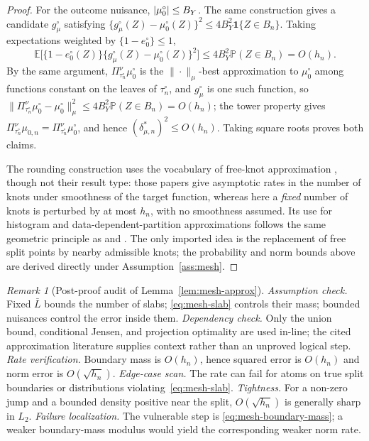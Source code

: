 \documentclass[11pt]{article}
\theoremstyle{plain}
\theoremstyle{definition}
\theoremstyle{remark}
\newtheorem{remark}[theorem]{Remark}
\newcommand{\E}{\mathbb{E}}
\newcommand{\PP}{\mathbb{P}}
\newcommand{\ez}{e_0}
\newcommand{\mz}{\mu_0}
\DeclarePairedDelimiter{\abs}{\lvert}{\rvert}
\newcommand{\mzn}{\mu_{0,n}}
\begin{document}
\begin{proof}
For the outcome nuisance, $\abs{\mz^\circ}\le B_Y$. The same construction
gives a candidate $g^\circ_\mu$ satisfying
$\{g^\circ_\mu(Z)-\mz^\circ(Z)\}^2\le4B_Y^2\mathbf1\{Z\in B_n\}$. Taking
expectations weighted by $\{1-\ez^\circ\}\le1$,
\[
  \E\bigl[\{1-\ez^\circ(Z)\}\{g^\circ_\mu(Z)-\mz^\circ(Z)\}^{2}\bigr]
  \le4B_Y^2\PP(Z\in B_n)=O(h_n).
\]
By the same argument, $\Pi_{\tau_n^\circ}^\nu\mz^\circ$ is the
$\|\cdot\|_\mu$-best approximation to $\mz^\circ$ among functions constant
on the leaves of $\tau_n^\circ$, and $g^\circ_\mu$ is one such function, so
$\|\Pi_{\tau_n^\circ}^\nu\mz^\circ-\mz^\circ\|_\mu^2\le4B_Y^2\PP(Z\in B_n)
=O(h_n)$; the tower property gives
$\Pi_{\tau_n^\circ}^\nu\mzn=\Pi_{\tau_n^\circ}^\nu\mz^\circ$, and hence
$(\delta^*_{\mu,n})^2\le O(h_n)$. Taking square roots proves both claims.

The rounding construction uses the vocabulary of free-knot approximation
\citep{deboor1973,barrowsmith1978}, though not their result type: those
papers give asymptotic rates in the number of knots under smoothness of the
target function, whereas here a \emph{fixed} number of knots is perturbed
by at most $h_n$, with no smoothness assumed. Its use for histogram and
data-dependent-partition approximations follows the same geometric
principle as \citet{nobel1996} and \citet{lugosinobel1996}. The only
imported idea is the replacement of free split points by nearby admissible
knots; the probability and norm bounds above are derived directly under
Assumption~\ref{ass:mesh}.
\end{proof}

\begin{remark}[Post-proof audit of Lemma~\ref{lem:mesh-approx}]
\emph{Assumption check.} Fixed $\bar L$ bounds the number of slabs;
\eqref{eq:mesh-slab} controls their mass; bounded nuisances control the
error inside them.
\emph{Dependency check.} Only the union bound, conditional Jensen, and
projection optimality are used in-line; the cited approximation literature
supplies context rather than an unproved logical step.
\emph{Rate verification.} Boundary mass is $O(h_n)$, hence squared error is
$O(h_n)$ and norm error is $O(\sqrt{h_n})$.
\emph{Edge-case scan.} The rate can fail for atoms on true split boundaries
or distributions violating~\eqref{eq:mesh-slab}.
\emph{Tightness.} For a non-zero jump and a bounded density positive near
the split, $O(\sqrt{h_n})$ is generally sharp in $L_2$.
\emph{Failure localization.} The vulnerable step is
\eqref{eq:mesh-boundary-mass}; a weaker boundary-mass modulus would yield
the corresponding weaker norm rate.
\end{remark}
\end{document}
